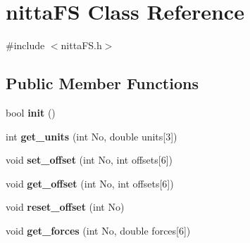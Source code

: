 \hypertarget{classnittaFS}{\section{nitta\-F\-S Class Reference}
\label{classnittaFS}
}


{\ttfamily \#include $<$nitta\-F\-S.\-h$>$}

\subsection*{Public Member Functions}
\begin{DoxyCompactItemize}
\item 
\hypertarget{classnittaFS_abe00fd4b734087de242182663b403894}{bool {\bfseries init} ()}\label{classnittaFS_abe00fd4b734087de242182663b403894}

\item 
\hypertarget{classnittaFS_a3bc8d3fc4ff796dae47b276efceca5e2}{int {\bfseries get\-\_\-units} (int No, double units\mbox{[}3\mbox{]})}\label{classnittaFS_a3bc8d3fc4ff796dae47b276efceca5e2}

\item 
\hypertarget{classnittaFS_a4efc973bd9431d7b31b1975228ad3d37}{void {\bfseries set\-\_\-offset} (int No, int offsets\mbox{[}6\mbox{]})}\label{classnittaFS_a4efc973bd9431d7b31b1975228ad3d37}

\item 
\hypertarget{classnittaFS_a52bb8b23bcdbc38934d24fdc3f4a2a1e}{void {\bfseries get\-\_\-offset} (int No, int offsets\mbox{[}6\mbox{]})}\label{classnittaFS_a52bb8b23bcdbc38934d24fdc3f4a2a1e}

\item 
\hypertarget{classnittaFS_a0d416bb7c24fb2173cf7992812e2a34b}{void {\bfseries reset\-\_\-offset} (int No)}\label{classnittaFS_a0d416bb7c24fb2173cf7992812e2a34b}

\item 
\hypertarget{classnittaFS_a401d5e4716bbc8517a25427328776e52}{void {\bfseries get\-\_\-forces} (int No, double forces\mbox{[}6\mbox{]})}\label{classnittaFS_a401d5e4716bbc8517a25427328776e52}

\end{DoxyCompactItemize}
